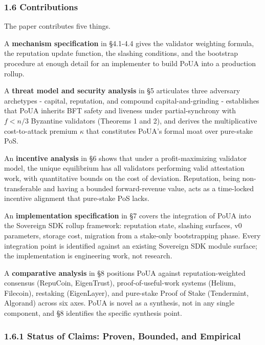 \documentclass[
  11pt,
]{article}
\begin{document}
\subsubsection{1.6 Contributions}\label{contributions}

The paper contributes five things.

A \textbf{mechanism specification} in §4.1-4.4 gives the validator
weighting formula, the reputation update function, the slashing
conditions, and the bootstrap procedure at enough detail for an
implementer to build PoUA into a production rollup.

A \textbf{threat model and security analysis} in §5 articulates three
adversary archetypes - capital, reputation, and compound
capital-and-grinding - establishes that PoUA inherits BFT safety and
liveness under partial-synchrony with \(f < n/3\) Byzantine validators
(Theorems 1 and 2), and derives the multiplicative cost-to-attack
premium \(\kappa\) that constitutes PoUA's formal moat over pure-stake
PoS.

An \textbf{incentive analysis} in §6 shows that under a
profit-maximizing validator model, the unique equilibrium has all
validators performing valid attestation work, with quantitative bounds
on the cost of deviation. Reputation, being non-transferable and having
a bounded forward-revenue value, acts as a time-locked incentive
alignment that pure-stake PoS lacks.

An \textbf{implementation specification} in §7 covers the integration of
PoUA into the Sovereign SDK rollup framework: reputation state, slashing
surfaces, v0 parameters, storage cost, migration from a stake-only
bootstrapping phase. Every integration point is identified against an
existing Sovereign SDK module surface; the implementation is engineering
work, not research.

A \textbf{comparative analysis} in §8 positions PoUA against
reputation-weighted consensus (RepuCoin, EigenTrust),
proof-of-useful-work systems (Helium, Filecoin), restaking (EigenLayer),
and pure-stake Proof of Stake (Tendermint, Algorand) across six axes.
PoUA is novel as a synthesis, not in any single component, and §8
identifies the specific synthesis point.

\subsubsection{1.6.1 Status of Claims: Proven, Bounded, and
Empirical}\label{status-of-claims-proven-bounded-and-empirical}
\end{document}

